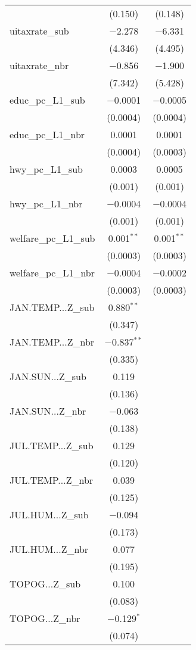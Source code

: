 \begin{table}[!htbp]
\begin{tabular}{@{\extracolsep{5pt}}lcc}
  & (0.150) & (0.148) \\ 
  uitaxrate\_sub & $-$2.278 & $-$6.331 \\ 
  & (4.346) & (4.495) \\ 
  uitaxrate\_nbr & $-$0.856 & $-$1.900 \\ 
  & (7.342) & (5.428) \\ 
  educ\_pc\_L1\_sub & $-$0.0001 & $-$0.0005 \\ 
  & (0.0004) & (0.0004) \\ 
  educ\_pc\_L1\_nbr & 0.0001 & 0.0001 \\ 
  & (0.0004) & (0.0003) \\ 
  hwy\_pc\_L1\_sub & 0.0003 & 0.0005 \\ 
  & (0.001) & (0.001) \\ 
  hwy\_pc\_L1\_nbr & $-$0.0004 & $-$0.0004 \\ 
  & (0.001) & (0.001) \\ 
  welfare\_pc\_L1\_sub & 0.001$^{**}$ & 0.001$^{**}$ \\ 
  & (0.0003) & (0.0003) \\ 
  welfare\_pc\_L1\_nbr & $-$0.0004 & $-$0.0002 \\ 
  & (0.0003) & (0.0003) \\ 
  JAN.TEMP...Z\_sub & 0.880$^{**}$ &  \\ 
  & (0.347) &  \\ 
  JAN.TEMP...Z\_nbr & $-$0.837$^{**}$ &  \\ 
  & (0.335) &  \\ 
  JAN.SUN...Z\_sub & 0.119 &  \\ 
  & (0.136) &  \\ 
  JAN.SUN...Z\_nbr & $-$0.063 &  \\ 
  & (0.138) &  \\ 
  JUL.TEMP...Z\_sub & 0.129 &  \\ 
  & (0.120) &  \\ 
  JUL.TEMP...Z\_nbr & 0.039 &  \\ 
  & (0.125) &  \\ 
  JUL.HUM...Z\_sub & $-$0.094 &  \\ 
  & (0.173) &  \\ 
  JUL.HUM...Z\_nbr & 0.077 &  \\ 
  & (0.195) &  \\ 
  TOPOG...Z\_sub & 0.100 &  \\ 
  & (0.083) &  \\ 
  TOPOG...Z\_nbr & $-$0.129$^{*}$ &  \\ 
  & (0.074) &  \\ 

\end{tabular}
\end{table}
